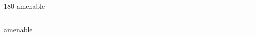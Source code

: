 
\begin{frame}
\begin{center}
\begin{turn}{180}
{\fontsize{2.5cm}{1em}\selectfont amenable}
\end{turn}
\vspace{1em}\par  
\hrule
\vspace{1em}\par  
{\fontsize{2.5cm}{1em}\selectfont amenable}
\end{center}
\end{frame}
